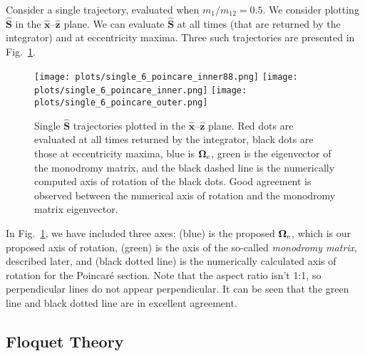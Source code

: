 \documentclass[11pt,
        usenames, %
        dvipsnames %
    ]{article}
\newcommand*{\bm}[1]{\boldsymbol{\mathbf{#1}}}
\newcommand*{\uv}[1]{\hat{\bm{#1}}}
\begin{document}
Consider a single trajectory, evaluated when $m_1 / m_{12} = 0.5$. We consider
plotting $\uv{S}$ in the $\uv{x}$--$\uv{z}$ plane. We can evaluate $\uv{S}$ at
all times (that are returned by the integrator) and at eccentricity maxima.
Three such trajectories are presented in Fig.~\ref{fig:poincare_singles}.

\begin{figure}
    \centering
    \texttt{[image: plots/single\_6\_poincare\_inner88.png]}
    \texttt{[image: plots/single\_6\_poincare\_inner.png]}
    \texttt{[image: plots/single\_6\_poincare\_outer.png]}
    \caption{Single $\uv{S}$ trajectories plotted in the $\uv{x}$--$\uv{z}$
    plane. Red dots are evaluated at all times returned by the integrator, black
    dots are those at eccentricity maxima, blue is $\bm{\Omega}_{\rm e}$, green
    is the eigenvector of the monodromy matrix, and the black dashed line is the
    numerically computed axis of rotation of the black dots. Good agreement is
    observed between the numerical axis of rotation and the monodromy matrix
    eigenvector.}\label{fig:poincare_singles}
\end{figure}

In Fig.~\ref{fig:poincare_singles}, we have included three axes: (blue) is the
proposed $\bm{\Omega}_{\rm e}$, which is our proposed axis of rotation, (green)
is the axis of the so-called \emph{monodromy matrix}, described later, and
(black dotted line) is the numerically calculated axis of rotation for the
Poincar\'e section. Note that the aspect ratio isn't 1:1, so perpendicular lines
do not appear perpendicular. It can be seen that the green line and black dotted
line are in excellent agreement.

\subsection{Floquet Theory}
\end{document}
